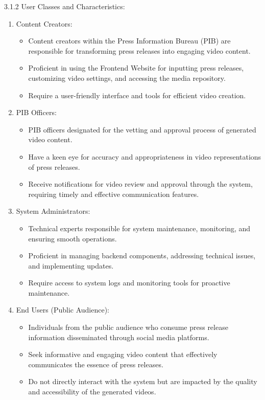 \documentclass[12pt]{article}
\begin{document}
3.1.2 User Classes and Characteristics:
\medskip
\begin{enumerate}
\item Content Creators:
\begin{itemize}
\item Content creators within the Press Information Bureau (PIB) are responsible for transforming press releases into engaging video content.
\item Proficient in using the Frontend Website for inputting press releases, customizing video settings, and accessing the media repository.
\item Require a user-friendly interface and tools for efficient video creation.
\end{itemize}
\item PIB Officers: 
\begin{itemize}
\item PIB officers designated for the vetting and approval process of generated video content.
\item Have a keen eye for accuracy and appropriateness in video representations of press releases.
\item Receive notifications for video review and approval through the system, requiring timely and effective communication features.
\end{itemize}
\item System Administrators:
\begin{itemize}
\item Technical experts responsible for system maintenance, monitoring, and ensuring smooth operations.
\item Proficient in managing backend components, addressing technical issues, and implementing updates.
\item Require access to system logs and monitoring tools for proactive maintenance.
\end{itemize}
\item End Users (Public Audience): 
\begin{itemize}
\item Individuals from the public audience who consume press release information disseminated through social media platforms.
\item Seek informative and engaging video content that effectively communicates the essence of press releases.
\item Do not directly interact with the system but are impacted by the quality and accessibility of the generated videos.
\end{itemize}

\end{enumerate}
\end{document}
